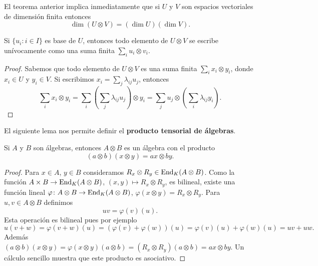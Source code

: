 \begin{exercise}
El teorema anterior implica inmediatamente que si $U$ y $V$ son espacios
vectoriales de dimensión finita entonces
\[
	\dim(U\otimes V)=(\dim U)(\dim V).
\]

\begin{corollary}
	Si $\{u_i:i\in I\}$ es base de $U$, entonces todo elemento de $U\otimes V$
	se escribe unívocamente como una suma finita $\sum_{i}u_i\otimes v_i$.
\end{corollary}

\begin{proof}
	Sabemos que todo elemento de $U\otimes V$ es una suma finita
	$\sum_i x_i\otimes y_i$, donde $x_i\in U$ y $y_i\in V$. Si escribimos 
	$x_i=\sum_j\lambda_{ij}u_j$, entonces
	\[
		\sum_i x_i\otimes y_i=\sum_i\left(\sum_j\lambda_{ij}u_j\right)\otimes y_i		
		=\sum_j u_j\otimes\left(\sum_i\lambda_{ij}y_i\right).
	\]
\end{proof}

%

El siguiente lema nos permite definir el \textbf{producto tensorial de
álgebras}.

\begin{lemma}
	Si $A$ y $B$ son álgebras, entonces $A\otimes B$ es un álgebra con el
	producto
	\[
		(a\otimes b)(x\otimes y)=ax\otimes by.
	\]
\end{lemma}

\begin{proof}
	Para $x\in A$, $y\in B$ consideramos $R_x\otimes R_y\in\operatorname{End}_K(A\otimes B)$.
	Como la función $A\times B\to\operatorname{End}_K(A\otimes B)$, $(x,y)\mapsto R_x\otimes
	R_y$, es bilineal, existe una función lineal $\varphi\colon A\otimes
	B\to\operatorname{End}_K(A\otimes B)$, $\varphi(x\otimes y)=R_x\otimes R_y$. Para $u,v\in A\otimes B$ definimos
	\[
		uv=\varphi(v)(u).
	\]
	Esta operación es bilineal pues por ejemplo
	\[
		u(v+w)=\varphi(v+w)(u)=(\varphi(v)+\varphi(w))(u)=\varphi(v)(u)+\varphi(w)(u)=uv+uw.
	\]
	Además
	$(a\otimes b)(x\otimes y)=\varphi(x\otimes y)(a\otimes b)=(R_x\otimes R_y)(a\otimes b)=ax\otimes by$.
	Un cálculo sencillo muestra que este producto es asociativo.
\end{proof}


\end{exercise}
